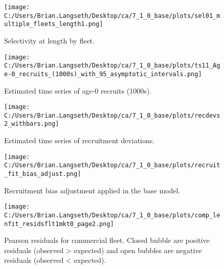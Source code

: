 \documentclass[11pt,
  english,
  a4paper,
]{article}
\begin{document}
\begin{figure}
\centering
\texttt{[image: C:/Users/Brian.Langseth/Desktop/ca/7\_1\_0\_base/plots/sel01\_multiple\_fleets\_length1.png]}
\caption{Selectivity at length by fleet.\label{fig:selex}}
\end{figure}

\tagmcend\tagstructend


\begin{figure}
\centering
\texttt{[image: C:/Users/Brian.Langseth/Desktop/ca/7\_1\_0\_base/plots/ts11\_Age-0\_recruits\_(1000s)\_with\_95\_asymptotic\_intervals.png]}
\caption{Estimated time series of age-0 recruits (1000s).\label{fig:recruits}}
\end{figure}

\tagmcend\tagstructend


\begin{figure}
\centering
\texttt{[image: C:/Users/Brian.Langseth/Desktop/ca/7\_1\_0\_base/plots/recdevs2\_withbars.png]}
\caption{Estimated time series of recruitment deviations.\label{fig:rec-devs}}
\end{figure}

\tagmcend\tagstructend


\begin{figure}
\centering
\texttt{[image: C:/Users/Brian.Langseth/Desktop/ca/7\_1\_0\_base/plots/recruit\_fit\_bias\_adjust.png]}
\caption{Recruitment bias adjustment applied in the base model.\label{fig:bias-adj}}
\end{figure}

\tagmcend\tagstructend


\begin{figure}
\centering
\texttt{[image: C:/Users/Brian.Langseth/Desktop/ca/7\_1\_0\_base/plots/comp\_lenfit\_residsflt1mkt0\_page2.png]}
\caption{Pearson residuals for commercial fleet. Closed bubble are positive residuals (observed \textgreater{} expected) and open bubbles are negative residuals (observed \textless{} expected).\label{fig:com-pearson}}
\end{figure}
\end{document}
